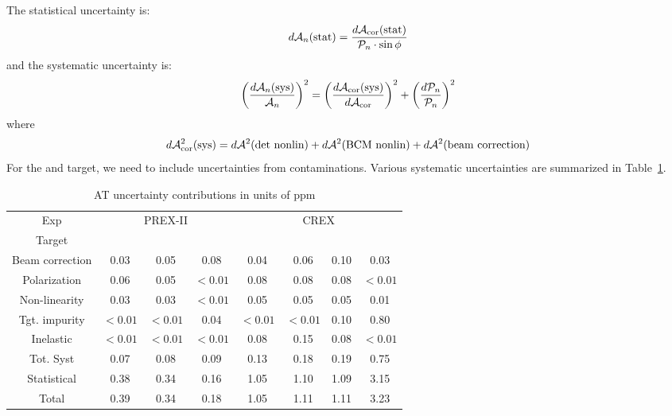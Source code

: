 The statistical uncertainty is:
\begin{equation}
    d\mathcal{A}_n(\text{stat}) = \frac{d\mathcal{A}_{\text{cor}}(\text{stat})}{\mathcal{P}_n \cdot \sin\phi}
\end{equation}
and the systematic uncertainty is:
\begin{equation}
    \left( \frac{d\mathcal{A}_n(\text{sys})}{\mathcal{A}_n} \right)^2 = 
	\left( \frac{d\mathcal{A}_{\text{cor}}(\text{sys})}{d\mathcal{A}_{\text{cor}}} \right)^2
	+ \left( \frac{d\mathcal{P}_n}{\mathcal{P}_n}\right)^2 
\end{equation}
where
\begin{equation}
    d\mathcal{A}^2_{\text{cor}}(\text{sys}) = d\mathcal{A}^2(\text{det\ nonlin}) + d\mathcal{A}^2(\text{BCM\ nonlin}) + d\mathcal{A}^2(\text{beam\ correction})
\end{equation}
For the \Pb and \Ca target, we need to include uncertainties from contaminations.
Various systematic uncertainties are summarized in Table~\ref{tab:AT_uncertainties}.
\begin{table}[!h]
    \centering
    \begin{tabular}{c c c c | c c c c}
	\hline
	Exp & \multicolumn{3}{c|}{PREX-II}  & \multicolumn{4}{c}{CREX}	\\
	Target	& \C	& \ca	& \Pb	& \C	& \ca	& \Ca	& \Pb	\\
	\hline
	Beam correction & 0.03  & 0.05  & 0.08  & 0.04  & 0.06  & 0.10  & 0.03	\\
	Polarization    & 0.06  & 0.05  & $<0.01$ & 0.08  & 0.08  & 0.08  & $<0.01$	\\
	Non-linearity   & 0.03  & 0.03  & $<0.01$ & 0.05  & 0.05  & 0.05  & 0.01	\\
	Tgt. impurity   & $<0.01$ & $<0.01$ & 0.04  & $<0.01$ & $<0.01$ & 0.10  & 0.80	\\
	Inelastic	& $<0.01$ & $<0.01$ & $<0.01$ & 0.08  & 0.15  & 0.08  & $<0.01$	\\
	\hline	
	Tot. Syst	& 0.07  & 0.08  & 0.09  & 0.13  & 0.18  & 0.19  & 0.75	\\
	Statistical	& 0.38  & 0.34  & 0.16  & 1.05  & 1.10  & 1.09  & 3.15	\\
	Total		& 0.39  & 0.34  & 0.18  & 1.05  & 1.11  & 1.11  & 3.23	\\
	\hline
    \end{tabular}
    \caption{AT uncertainty contributions in units of ppm}
    \label{tab:AT_uncertainties}
\end{table}


